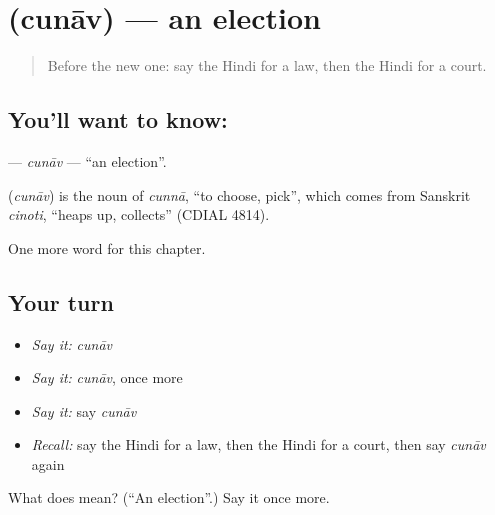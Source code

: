 \section[\texorpdfstring{\hi{चुनाव} (cunāv)}{चुनाव (cunāv)}]{ (cunāv) — an election}

\label{lesson:HI-C218-cunav}



\begin{quote}
Before the new one: say the Hindi for a law, then the Hindi for a court.
\end{quote}

\subsection*{You'll want to know: }
\textbf{} — \emph{cunāv} — \textquotedblleft{}an election\textquotedblright{}.

\begin{cousinweb}
\textbf{} (\emph{cunāv}) is the noun of \emph{cunnā}, \textquotedblleft{}to choose, pick\textquotedblright{}, which comes from Sanskrit \emph{cinoti}, \textquotedblleft{}heaps up, collects\textquotedblright{} (CDIAL 4814).
\end{cousinweb}

\begin{grammarlens}[title={What you've built}]
One more word for this chapter.
\end{grammarlens}

\subsection*{Your turn}
\begin{itemize}
\raggedright
  \item \emph{Say it:} \emph{cunāv}
  \item \emph{Say it:} \emph{cunāv}, once more
  \item \emph{Say it:} say \emph{cunāv}
  \item \emph{Recall:} say the Hindi for a law, then the Hindi for a court, then say \emph{cunāv} again
\end{itemize}

\begin{tcolorbox}[breakable,colback=teal!4,colframe=teal!35!black,title={Before you move on}]
What does  mean? (\textquotedblleft{}An election\textquotedblright{}.) Say it once more.
\end{tcolorbox}
